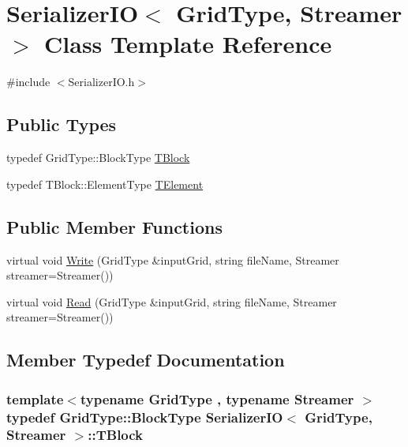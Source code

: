 \hypertarget{class_serializer_i_o}{}\section{Serializer\+I\+O$<$ Grid\+Type, Streamer $>$ Class Template Reference}
\label{class_serializer_i_o}


{\ttfamily \#include $<$Serializer\+I\+O.\+h$>$}

\subsection*{Public Types}
\begin{DoxyCompactItemize}
\item 
typedef Grid\+Type\+::\+Block\+Type \hyperlink{class_serializer_i_o_a7ceedfa7233f4885ae66d00745f2b77b}{T\+Block}
\item 
typedef T\+Block\+::\+Element\+Type \hyperlink{class_serializer_i_o_afdca5fb894f8e5e8a25d57f28acdad7f}{T\+Element}
\end{DoxyCompactItemize}
\subsection*{Public Member Functions}
\begin{DoxyCompactItemize}
\item 
virtual void \hyperlink{class_serializer_i_o_a1d96b41248e5cb866db73715391a7df1}{Write} (Grid\+Type \&input\+Grid, string file\+Name, Streamer streamer=Streamer())
\item 
virtual void \hyperlink{class_serializer_i_o_a50d3ed119bceea19be2fb177495c21f3}{Read} (Grid\+Type \&input\+Grid, string file\+Name, Streamer streamer=Streamer())
\end{DoxyCompactItemize}


\subsection{Member Typedef Documentation}
\hypertarget{class_serializer_i_o_a7ceedfa7233f4885ae66d00745f2b77b}{}
\subsubsection[{T\+Block}]{\setlength{\rightskip}{0pt plus 5cm}template$<$typename Grid\+Type , typename Streamer $>$ typedef Grid\+Type\+::\+Block\+Type {\bf Serializer\+I\+O}$<$ Grid\+Type, Streamer $>$\+::{\bf T\+Block}}\label{class_serializer_i_o_a7ceedfa7233f4885ae66d00745f2b77b}
\hypertarget{class_serializer_i_o_afdca5fb894f8e5e8a25d57f28acdad7f}{}
